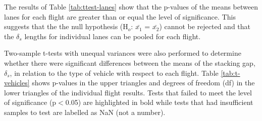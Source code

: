 \documentclass[preprint,12pt,a4paper]{elsarticle}
\begin{document}
\begin{linenumbers}
The results of Table \ref{tab:ttest-lanes} show that the p-values of the means between lanes for each flight are greater than or equal the level of significance. This suggests that the the null hypothesis (H$_{o}$: $\bar{x_{1}}$ = $\bar{x_{2}}$) cannot be rejected and that the $\delta_{s}$ lengths for individual lanes can be pooled for each flight.

Two-sample t-tests with unequal variances were also performed to determine whether there were significant differences between the means of the stacking gap, $\delta_{s}$, in relation to the type of vehicle with respect to each flight. Table \ref{tab:t-vehicles} shows p-values in the upper triangles and degrees of freedom (df) in the lower triangles of the individual flight results. Tests that failed to meet the level of significance (p$<$0.05) are highlighted in bold while tests that had insufficient samples to test are labelled as NaN (not a number).


\end{linenumbers}
\end{document}
